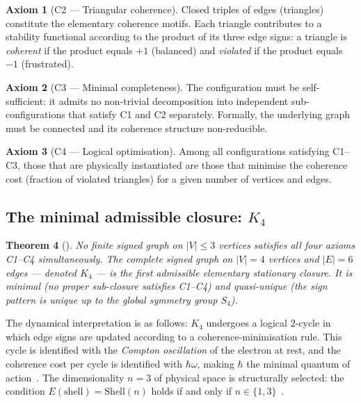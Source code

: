 \documentclass[11pt,a4paper]{article}
\theoremstyle{plain}
\newtheorem{theorem}{Theorem}[section]
\theoremstyle{definition}
\newtheorem{axiom}[theorem]{Axiom}
\theoremstyle{remark}
\newcommand{\Kfour}{K_4}
\begin{document}
\begin{axiom}[C2 — Triangular coherence]
Closed triples of edges (triangles) constitute the elementary coherence motifs.
Each triangle contributes to a stability functional according to the product of its three edge signs: a triangle is \emph{coherent} if the product equals $+1$ (balanced) and \emph{violated} if the product equals $-1$ (frustrated).
\end{axiom}

\begin{axiom}[C3 — Minimal completeness]
The configuration must be self-sufficient: it admits no non-trivial decomposition into independent sub-configurations that satisfy C1 and C2 separately.
Formally, the underlying graph must be connected and its coherence structure non-reducible.
\end{axiom}

\begin{axiom}[C4 — Logical optimisation]
Among all configurations satisfying C1--C3, those that are physically instantiated are those that minimise the coherence cost (fraction of violated triangles) for a given number of vertices and edges.
\end{axiom}

\subsection{The minimal admissible closure: \texorpdfstring{$\Kfour$}{K4}}
\label{subsec:K4}

\begin{theorem}[\citep{D16a}]
\label{thm:K4}
No finite signed graph on $|V|\leq 3$ vertices satisfies all four axioms C1--C4 simultaneously.
The complete signed graph on $|V|=4$ vertices and $|E|=6$ edges — denoted $\Kfour$ — is the first admissible elementary stationary closure.
It is minimal (no proper sub-closure satisfies C1--C4) and quasi-unique (the sign pattern is unique up to the global symmetry group $S_4$).
\end{theorem}

The dynamical interpretation is as follows: $\Kfour$ undergoes a logical $2$-cycle in which edge signs are updated according to a coherence-minimisation rule.
This cycle is identified with the \emph{Compton oscillation} of the electron at rest, and the coherence cost per cycle is identified with $\hbar\omega$, making $\hbar$ the minimal quantum of action~\citep{D01,D02}.
The dimensionality $n=3$ of physical space is structurally selected: the condition $E(\mathrm{shell})=\mathrm{Shell}(n)$ holds if and only if $n\in\{1,3\}$~\citep{D23}.
\end{document}

